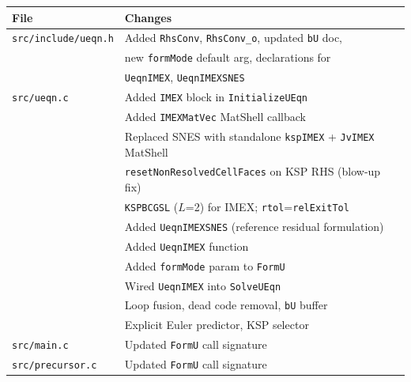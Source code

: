 \documentclass[12pt,a4paper]{article}
\begin{document}
	\begin{center}
		\begin{tabular}{ll}
			\toprule
			File & Changes \\
			\midrule
			\texttt{src/include/ueqn.h} & Added \texttt{RhsConv}, \texttt{RhsConv\_o},
			updated \texttt{bU} doc, \\
			& new \texttt{formMode} default arg, declarations for \\
			& \texttt{UeqnIMEX}, \texttt{UeqnIMEXSNES} \\
			\texttt{src/ueqn.c} & Added \texttt{IMEX} block in \texttt{InitializeUEqn} \\
			& Added \texttt{IMEXMatVec} MatShell callback \\
			& Replaced SNES with standalone \texttt{kspIMEX} + \texttt{JvIMEX} MatShell \\
			& \texttt{resetNonResolvedCellFaces} on KSP RHS (blow-up fix) \\
			& \texttt{KSPBCGSL} ($L$=2) for IMEX; \texttt{rtol}=\texttt{relExitTol} \\
			& Added \texttt{UeqnIMEXSNES} (reference residual formulation) \\
			& Added \texttt{UeqnIMEX} function \\
			& Added \texttt{formMode} param to \texttt{FormU} \\
			& Wired \texttt{UeqnIMEX} into \texttt{SolveUEqn} \\
			& Loop fusion, dead code removal, \texttt{bU} buffer \\
			& Explicit Euler predictor, KSP selector \\
			\texttt{src/main.c} & Updated \texttt{FormU} call signature \\
			\texttt{src/precursor.c} & Updated \texttt{FormU} call signature \\
			\bottomrule
		\end{tabular}
	\end{center}
	
\end{document}
